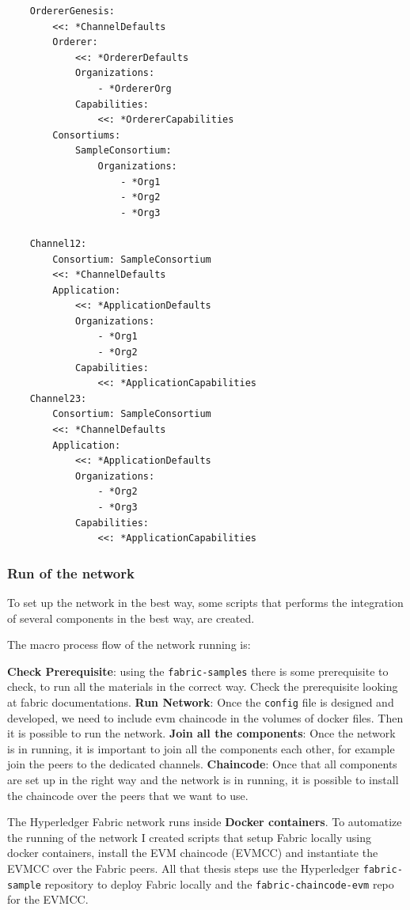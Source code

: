 \begin{lstlisting}
    OrdererGenesis:
        <<: *ChannelDefaults
        Orderer:
            <<: *OrdererDefaults
            Organizations:
                - *OrdererOrg
            Capabilities:
                <<: *OrdererCapabilities
        Consortiums:
            SampleConsortium:
                Organizations:
                    - *Org1
                    - *Org2
                    - *Org3

    Channel12:
        Consortium: SampleConsortium
        <<: *ChannelDefaults
        Application:
            <<: *ApplicationDefaults
            Organizations:
                - *Org1
                - *Org2
            Capabilities:
                <<: *ApplicationCapabilities
    Channel23:
        Consortium: SampleConsortium
        <<: *ChannelDefaults
        Application:
            <<: *ApplicationDefaults
            Organizations:
                - *Org2
                - *Org3
            Capabilities:
                <<: *ApplicationCapabilities    
\end{lstlisting}

\subsubsection{Run of the network}

To set up the network in the best way, some scripts that performs the integration of several components 
in the best way, are created.

The macro process flow of the network running is:
\begin{outline}[enumerate]
    \1 \textbf{Check Prerequisite}: using the \texttt{fabric-samples}\cite{fabric-samples} there is
    some prerequisite to check, to run all the materials in the correct way. Check the prerequisite looking at fabric 
    documentations\cite{fabric-doc}.
    \1 \textbf{Run Network}: Once the \texttt{config} file is designed and developed, we need to include evm chaincode 
    in the volumes of docker files. Then it is possible to run the network.
    \1 \textbf{Join all the components}: Once the network is in running, it is important to join all the components each 
    other, for example join the peers to the dedicated channels.
    \1 \textbf{Chaincode}: Once that all components are set up in the right way and the network is in running, it is 
    possible to install the chaincode over the peers that we want to use. 
\end{outline}

The Hyperledger Fabric network runs inside \textbf{Docker containers}. To automatize the running 
of the network I created scripts that setup Fabric locally using docker containers, install the EVM chaincode (EVMCC) 
and instantiate the EVMCC over the Fabric peers. All that thesis steps use the Hyperledger \texttt{fabric-sample} 
repository to deploy Fabric locally and the \texttt{fabric-chaincode-evm} repo for the EVMCC.

